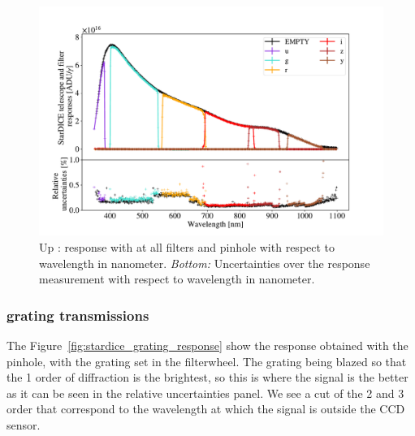 \begin{figure}[h]
    \centering
    \includegraphics[width=\columnwidth]{fig/stardice_75um_response.pdf}
    \caption{Up : \SD response with at all filters and \spinhole pinhole with respect to wavelength in nanometer. \textit{Bottom:} Uncertainties over the \SD response measurement with respect to wavelength in nanometer.}
    \label{fig:stardice_75um_response}
\end{figure}

\subsubsection{\SD grating transmissions}

The Figure~\ref{fig:stardice_grating_response} show the \SD response obtained with the \spinhole pinhole, with the grating set in the filterwheel. The grating being blazed so that the 1 order of diffraction is the brightest, so this is where the signal is the better as it can be seen in the relative uncertainties panel. We see a cut of the 2 and 3 order that correspond to the wavelength at which the signal is outside the CCD sensor.

